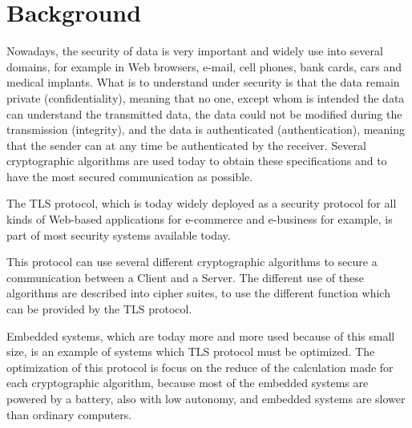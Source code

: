 \chapter{Background}

Nowadays, the security of data is very important and widely use into several
domains, for example in Web browsers, e-mail, cell phones, bank cards, cars and
medical implants.
What is to understand under security is that the data remain
private (confidentiality), meaning that no one, except whom is intended the data
can understand the transmitted data, the data could not be modified
during the transmission (integrity), and the data is authenticated
(authentication), meaning that the sender can at any time be
authenticated by the receiver.
Several cryptographic algorithms are used today to obtain these specifications
and to have the most secured communication as possible.

The TLS protocol, which is today widely deployed as a security protocol for all
kinds of Web-based applications for e-commerce and e-business for example, is
part of most security systems available today.

This protocol can use several different cryptographic algorithms to secure a
communication between a Client and a Server.
The different use of these algorithms are described into cipher suites, to use
the different function which can be provided by the TLS protocol.

Embedded systems, which are today more and more used because of this small size,
is an example of systems which TLS protocol must be optimized. The optimization
of this protocol is focus on the reduce of the calculation made for each
cryptographic algorithm, because most of the embedded systems are
powered by a battery, also with low autonomy, and embedded systems are slower
than ordinary computers.

